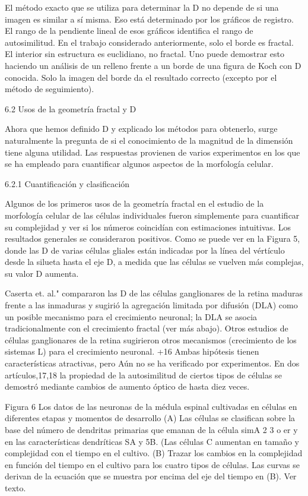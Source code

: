 \documentclass[11pt]{article}
\begin{document}
El método exacto que se utiliza para determinar la D no depende de si una imagen es similar a sí misma. Eso está determinado por los gráficos de registro. El rango de la pendiente lineal de esos gráficos identifica el rango de autosimilitud. En el trabajo considerado anteriormente, solo el borde es fractal. El interior sin estructura es euclidiano, no fractal. Uno puede demostrar esto haciendo un análisis de un relleno frente a un borde de una figura de Koch con D conocida. Solo la imagen del borde da el resultado correcto (excepto por el método de seguimiento).

6.2 Usos de la geometría fractal y D

Ahora que hemos definido D y explicado los métodos para obtenerlo, surge naturalmente la pregunta de si el conocimiento de la magnitud de la dimensión tiene alguna utilidad. Las respuestas provienen de varios experimentos en los que se ha empleado para cuantificar algunos aspectos de la morfología celular. 

6.2.1 Cuantificación y clasificación

Algunos de los primeros usos de la geometría fractal en el estudio de la morfología celular de las células individuales fueron simplemente para cuantificar su complejidad y ver si los números coincidían con estimaciones intuitivas. Los resultados generales se consideraron positivos. Como se puede ver en la Figura 5, donde las D de varias células gliales están indicadas por la línea del vértículo desde la silueta hasta el eje D, a medida que las células se vuelven más complejas, su valor D aumenta.


Caserta et. al." compararon las D de las células ganglionares de la retina maduras frente a las inmaduras y sugirió la agregación limitada por difusión (DLA) como un posible mecanismo para el crecimiento neuronal; la DLA se asocia tradicionalmente con el crecimiento fractal (ver más abajo).
Otros estudios de células ganglionares de la retina sugirieron otros mecanismos (crecimiento de los sistemas L) para el crecimiento neuronal. +16 Ambas hipótesis tienen características atractivas, pero Aún no se ha verificado por experimentos. En dos artículos,17,18 la propiedad de la autosimilitud de ciertos tipos de células se demostró mediante cambios de aumento óptico de hasta diez veces.

Figura 6 Los datos de las neuronas de la médula espinal cultivadas en células en diferentes etapas y momentos de desarrollo (A) Las células se clasifican sobre la base del número de dendritas primarias que emanan de la célula simA 2 3 o er y en las características dendríticas SA y 5B. (Las células C aumentan en tamaño y complejidad con el tiempo en el cultivo. (B) Trazar los cambios en la complejidad en función del tiempo en el cultivo para los cuatro tipos de células. Las curvas se derivan de la ecuación que se muestra por encima del eje del tiempo en (B). Ver texto.
\end{document}
